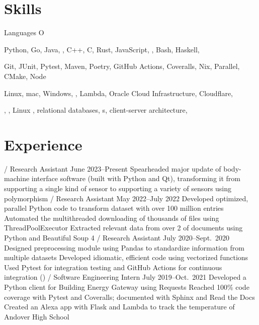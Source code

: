 \section{Skills}
\begin{labeling}{Languages O}
    \item [Languages] Python, Go, Java, , C++, C, Rust, JavaScript, , Bash, Haskell, \textsmaller{\LaTeX}
    \item [Software] Git, JUnit, Pytest, Maven, Poetry, GitHub Actions, Coveralls, Nix,  Parallel, CMake, Node
    \item [Platforms] Linux, mac, Windows, ,  Lambda, Oracle Cloud Infrastructure, Cloudflare, 
    \item [Concepts] , , Linux , relational databases, s, client-server architecture, 
\end{labeling}

\section{Experience}
\begin{outline}
     / Research Assistant
    \hfill June 2023--Present
        \1 Spearheaded major update of body-machine interface software (built with Python and Qt),
        transforming it from supporting a single kind of sensor to supporting a variety of sensors using polymorphism
     / Research Assistant
    \hfill May 2022--July 2022
        \1 Developed optimized, parallel Python code to transform dataset with over 100 million entries
        \1 Automated the multithreaded downloading of thousands of files using ThreadPoolExecutor
        \1 Extracted relevant data from over 2  of   documents using Python and Beautiful Soup 4
     / Research Assistant
    \hfill July 2020--Sept.\ 2020
        \1 Designed preprocessing module using Pandas to standardize information from multiple datasets
            \2 Developed idiomatic, efficient code using vectorized functions
            \2 Used Pytest for integration testing and GitHub Actions for continuous integration ()
     / Software Engineering Intern
    \hfill July 2019--Oct.\ 2021
        \1 Developed a Python client for Building Energy Gateway using Requests
            \2 Reached 100\% code coverage with Pytest and Coveralls; documented  with Sphinx and Read the Docs
        \1 Created an Alexa app with Flask and  Lambda to track the temperature of Andover High School
\end{outline}

